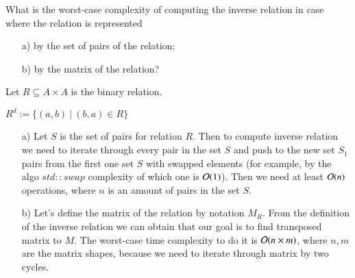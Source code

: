 \documentclass[12pt]{report}
\begin{document}
\boldmath
{}
\begin{problem}{}
    What is the worst-case complexity of computing the inverse relation in case where the relation is represented 
    \begin{itemize}
        \item[a) ] by the set of pairs of the relation;
        \item[b) ] by the matrix of the relation?
    \end{itemize}
\end{problem}
\begin{solution}
Let $R \subseteq A \times A$ is the binary relation.
\begin{definition}{}{}
    $R^d := \{(a,b)\ | \ (b,a) \in R\}$
\end{definition}
\begin{itemize}
    \item[a) ] Let $S$ is the set of pairs for relation $R$. Then to compute inverse relation we need to iterate through every pair in the set $S$ and push to the new set $S_1$ pairs from the first one set $S$ with swapped elements (for example, by the algo $std::swap$ complexity of  which one is ${\cal O}(1)$). Then we need at least ${\cal O}(n)$ operations, where $n$ is an amount of pairs in the set $S$.
    \item[b) ] Let's define the matrix of the relation by notation $M_{R}$. From the definition of the inverse relation we can obtain that our goal is to find transposed matrix to $M$. The worst-case time complexity to do it is ${\cal O}(n\times m)$, where $n, m$ are the matrix shapes, because we need to iterate through matrix by two cycles.
\end{itemize}
\end{solution}
\end{document}
